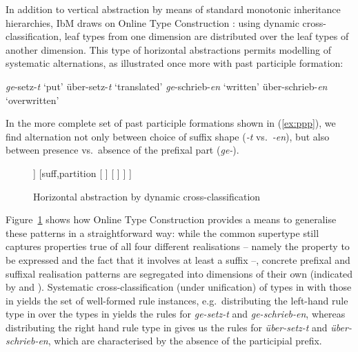 \documentclass[output=paper
 	        ,biblatex
                ,babelshorthands
                ,newtxmath
                ,draftmode
                ,colorlinks, citecolor=brown
]{langscibook}
\begin{document}
\begin{exe}
\begin{xlist}
\begin{exe}
\begin{xlist}
In addition to vertical abstraction by means of standard monotonic
inheritance hierarchies, IbM draws on Online Type Construction
\citep{Koenig94}: using dynamic cross-classification, leaf types from
one dimension are distributed over the leaf types of another
dimension. This type of horizontal abstractions permits modelling of
systematic alternations, as illustrated once more with  past
participle formation:

\begin{exe}
  \ex \label{ex:ppp}
  \begin{xlist}

    \ex \textit{ge}-setz-\textit{t} `put'
    \ex über-setz-\textit{t} `translated'
    \ex \textit{ge}-schrieb-\textit{en} `written'
    \ex über-schrieb-\textit{en} `overwritten'
  \end{xlist}
\end{exe}

In the more complete set of past participle formations shown in
(\ref{ex:ppp}), we find alternation not only between choice of suffix
shape (\textit{-t} vs.\ \textit{-en}), but also between presence
vs.\ absence of the prefixal part (\textit{ge-}).

\begin{figure}
  \centering
  \footnotesize
\begin{forest}
[%
\avm{
	[mud &	\{[tam & ppp]\} \\
	mph & < \ldots\ , [pc & 1] > ]
}
	[pref,partition
		[%
		\avm{
			[mph & <[ph & ge \\
					pc & -1], ![ ]!> ]
		}
		]
		[%
		\avm{
			[mph & <![ ]!> ]
		}
		]
	]
	[suff,partition
		[%
		]
		[%
		]
	]
]
\end{forest}
  \caption{Horizontal abstraction by dynamic cross-classification}\label{fig:Horizontal}
\end{figure}

Figure~\ref{fig:Horizontal} shows how Online Type Construction provides
a means to generalise these patterns in a straightforward way: while the
common supertype still captures properties true of all four different
realisations -- namely the property to be expressed and the fact that it
involves at least a suffix --, concrete prefixal and suffixal realisation
patterns are segregated into dimensions of their own (indicated by
 and ). Systematic cross-classification
(under unification) of types in  with those in
 yields the set of well-formed rule instances,
e.g.\ distributing the left-hand rule type in  over the
types in  yields the rules for \textit{ge-setz-t} and
\textit{ge-schrieb-en}, whereas distributing the right hand rule type
in  gives us the rules for \textit{über-setz-t} and
\textit{über-schrieb-en}, which are characterised by the absence of
the participial prefix.


\end{xlist}
\end{exe}
\end{xlist}
\end{exe}
\end{document}
